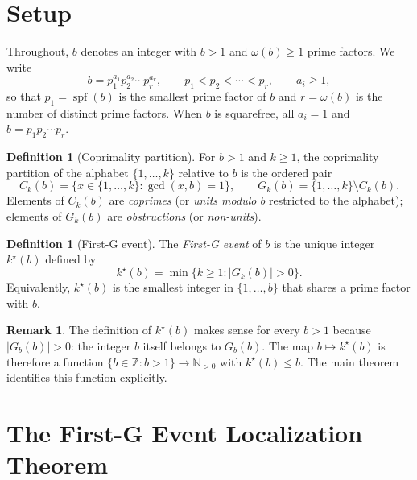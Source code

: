 \documentclass[11pt,reqno]{amsart}
\theoremstyle{definition}
\newtheorem{definition}[theorem]{Definition}
\newtheorem{remark}[theorem]{Remark}
\newcommand{\N}{\mathbb{N}}
\newcommand{\Z}{\mathbb{Z}}
\DeclareMathOperator{\spf}{spf}
\begin{document}
\section{Setup}
\label{sec:setup}

Throughout, $b$ denotes an integer with $b > 1$ and $\omega(b) \ge 1$ prime
factors. We write
\[
  b = p_1^{a_1} p_2^{a_2} \cdots p_r^{a_r},
  \qquad
  p_1 < p_2 < \cdots < p_r,
  \qquad
  a_i \ge 1,
\]
so that $p_1 = \spf(b)$ is the smallest prime factor of $b$ and $r = \omega(b)$
is the number of distinct prime factors. When $b$ is squarefree, all $a_i = 1$
and $b = p_1 p_2 \cdots p_r$.

\begin{definition}[Coprimality partition]
For $b > 1$ and $k \ge 1$, the coprimality partition of the alphabet
$\{1,\ldots,k\}$ relative to $b$ is the ordered pair
\[
  C_k(b) = \{x \in \{1,\ldots,k\} : \gcd(x,b) = 1\},
  \qquad
  G_k(b) = \{1,\ldots,k\} \setminus C_k(b).
\]
Elements of $C_k(b)$ are \emph{coprimes} (or \emph{units modulo $b$}
restricted to the alphabet); elements of $G_k(b)$ are \emph{obstructions}
(or \emph{non-units}).
\end{definition}

\begin{definition}[First-G event]
The \emph{First-G event} of $b$ is the unique integer $k^\star(b)$ defined by
\[
  k^\star(b) = \min\{ k \ge 1 : |G_k(b)| > 0 \}.
\]
Equivalently, $k^\star(b)$ is the smallest integer in $\{1,\ldots,b\}$ that
shares a prime factor with $b$.
\end{definition}

\begin{remark}
The definition of $k^\star(b)$ makes sense for every $b > 1$ because
$|G_b(b)| > 0$: the integer $b$ itself belongs to $G_b(b)$. The map
$b \mapsto k^\star(b)$ is therefore a function $\{b \in \Z : b > 1\} \to
\N_{>0}$ with $k^\star(b) \le b$. The main theorem identifies this function
explicitly.
\end{remark}

\section{The First-G Event Localization Theorem}
\label{sec:main}
\end{document}
